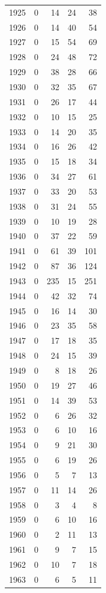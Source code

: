 \documentclass[
  english,
]{article}
\begin{document}
\begin{longtable}{rrrrr}
1925 & 0 & 14 & 24 & 38 \\ 
1926 & 0 & 14 & 40 & 54 \\ 
1927 & 0 & 15 & 54 & 69 \\ 
1928 & 0 & 24 & 48 & 72 \\ 
1929 & 0 & 38 & 28 & 66 \\ 
1930 & 0 & 32 & 35 & 67 \\ 
1931 & 0 & 26 & 17 & 44 \\ 
1932 & 0 & 10 & 15 & 25 \\ 
1933 & 0 & 14 & 20 & 35 \\ 
1934 & 0 & 16 & 26 & 42 \\ 
1935 & 0 & 15 & 18 & 34 \\ 
1936 & 0 & 34 & 27 & 61 \\ 
1937 & 0 & 33 & 20 & 53 \\ 
1938 & 0 & 31 & 24 & 55 \\ 
1939 & 0 & 10 & 19 & 28 \\ 
1940 & 0 & 37 & 22 & 59 \\ 
1941 & 0 & 61 & 39 & 101 \\ 
1942 & 0 & 87 & 36 & 124 \\ 
1943 & 0 & 235 & 15 & 251 \\ 
1944 & 0 & 42 & 32 & 74 \\ 
1945 & 0 & 16 & 14 & 30 \\ 
1946 & 0 & 23 & 35 & 58 \\ 
1947 & 0 & 17 & 18 & 35 \\ 
1948 & 0 & 24 & 15 & 39 \\ 
1949 & 0 & 8 & 18 & 26 \\ 
1950 & 0 & 19 & 27 & 46 \\ 
1951 & 0 & 14 & 39 & 53 \\ 
1952 & 0 & 6 & 26 & 32 \\ 
1953 & 0 & 6 & 10 & 16 \\ 
1954 & 0 & 9 & 21 & 30 \\ 
1955 & 0 & 6 & 19 & 26 \\ 
1956 & 0 & 5 & 7 & 13 \\ 
1957 & 0 & 11 & 14 & 26 \\ 
1958 & 0 & 3 & 4 & 8 \\ 
1959 & 0 & 6 & 10 & 16 \\ 
1960 & 0 & 2 & 11 & 13 \\ 
1961 & 0 & 9 & 7 & 15 \\ 
1962 & 0 & 10 & 7 & 18 \\ 
1963 & 0 & 6 & 5 & 11 \\ 

\end{longtable}
\end{document}
